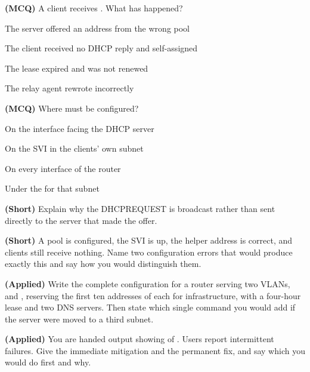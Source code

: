\begin{reviewq}
  \item \textbf{(MCQ)} A client receives . What has happened?
        \begin{tight}
          \item[(a)] The server offered an address from the wrong pool
          \item[(b)] The client received no DHCP reply and self-assigned
          \item[(c)] The lease expired and was not renewed
          \item[(d)] The relay agent rewrote  incorrectly
        \end{tight}
  \item \textbf{(MCQ)} Where must  be configured?
        \begin{tight}
          \item[(a)] On the interface facing the DHCP server
          \item[(b)] On the SVI in the clients' own subnet
          \item[(c)] On every interface of the router
          \item[(d)] Under the  for that subnet
        \end{tight}
  \item \textbf{(Short)} Explain why the DHCPREQUEST is broadcast rather than sent
        directly to the server that made the offer.
  \item \textbf{(Short)} A pool is configured, the SVI is up, the helper address
        is correct, and clients still receive nothing. Name two configuration
        errors that would produce exactly this and say how you would distinguish
        them.
  \item \textbf{(Applied)} Write the complete configuration for a router serving
        two VLANs,  and , reserving the first
        ten addresses of each for infrastructure, with a four-hour lease and two
        DNS servers. Then state which single command you would add if the server
        were moved to a third subnet.
  \item \textbf{(Applied)} You are handed  output showing
         of . Users report
        intermittent failures. Give the immediate mitigation and the permanent
        fix, and say which you would do first and why.
\end{reviewq}
